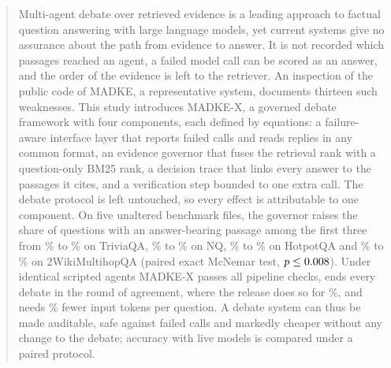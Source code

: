 \begin{abstract}
Multi-agent debate over retrieved evidence is a leading approach to factual question answering with large language models, yet current systems give no assurance about the path from evidence to answer. It is not recorded which passages reached an agent, a failed model call can be scored as an answer, and the order of the evidence is left to the retriever. An inspection of the public code of MADKE, a representative system, documents thirteen such weaknesses. This study introduces MADKE-X, a governed debate framework with four components, each defined by equations: a failure-aware interface layer that reports failed calls and reads replies in any common format, an evidence governor that fuses the retrieval rank with a question-only BM25 rank, a decision trace that links every answer to the passages it cites, and a verification step bounded to one extra call. The debate protocol is left untouched, so every effect is attributable to one component. On five unaltered benchmark files, the governor raises the share of questions with an answer-bearing passage among the first three from \VCovThreeOrigTQA\% to \VCovThreeRrfTQA\% on TriviaQA, \VCovThreeOrigNQ\% to \VCovThreeRrfNQ\% on NQ, \VCovThreeOrigHQA\% to \VCovThreeRrfHQA\% on HotpotQA and \VCovThreeOrigWMQ\% to \VCovThreeRrfWMQ\% on 2WikiMultihopQA (paired exact McNemar test, $p\le\VPvalMax$). Under identical scripted agents MADKE-X passes all \VInvChecksAll{} pipeline checks, ends every debate in the round of agreement, where the release does so for \VStopPctRel\%, and needs \VInTokRed\% fewer input tokens per question. A debate system can thus be made auditable, safe against failed calls and markedly cheaper without any change to the debate; accuracy with live models is compared under a paired protocol.
\end{abstract}
